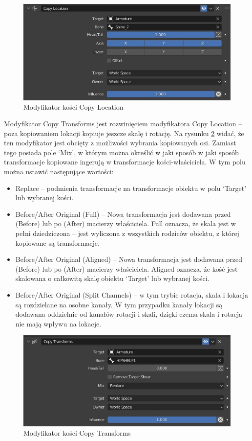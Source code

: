 \documentclass[12pt,twoside]{article}
\begin{document}
\begin{figure}[ht]
    \centering
    \includegraphics[width=12cm]{BlenderPict/Constraints_Copy_Location.jpg}
    \caption{Modyfikator kości Copy Location}
    \label{Blender:CopyLocation}
\end{figure}

Modyfikator Copy Transforms jest rozwinięciem modyfikatora Copy Location -- poza kopiowaniem lokacji kopiuje jeszcze skalę i rotację. Na rysunku \ref{Blender:CopyTransform} widać, że ten modyfikator jest obcięty z możliwości wybrania kopiowanych osi. Zamiast tego posiada pole `Mix', w którym można określić w jaki sposób w jaki sposób transformacje kopiowane ingerują w transformacje kości-właściciela. W tym polu można ustawić następujące wartości:
\begin{itemize}
	\item Replace -- podmienia transformacje na transformacje obiektu w polu `Target' lub wybranej kości.
	\item Before/After Original (Full) -- Nowa transformacja jest dodawana przed (Before) lub po (After) macierzy właściciela. Full oznacza, że skala jest w pełni dziedziczona -- jest wyliczona z wszystkich rodziców obiektu, z której kopiowane są transformacje.
	\item Before/After Original (Aligned)  -- Nowa transformacja jest dodawana przed (Before) lub po (After) macierzy właściciela. Aligned oznacza, że kość jest skalowana o całkowitą skalę obiektu `Target' lub wybranej kości.
	\item Before/After Original (Split Channels) -- w tym trybie rotacja, skala i lokacja są rozdzielane na osobne kanały. W tym przypadku kanały lokacji są dodawana oddzielnie od kanałów rotacji i skali, dzięki czemu skala i rotacja nie mają wpływu na lokacje.
\end{itemize} 

\begin{figure}[ht]
    \centering
    \includegraphics[width=12cm]{BlenderPict/Constraints_Copy_Transforms.jpg}
    \caption{Modyfikator kości Copy Transforms}
    \label{Blender:CopyTransform}
\end{figure}
\clearpage
\end{document}
